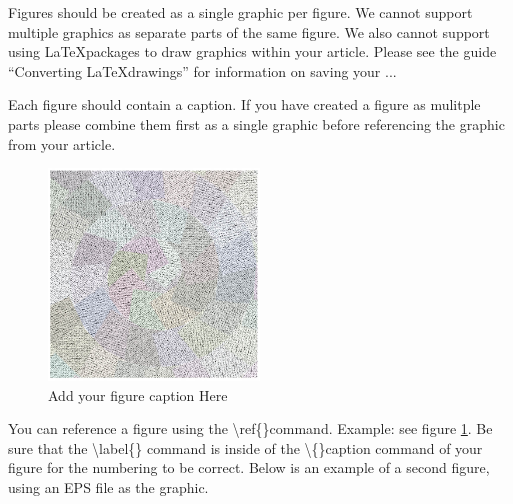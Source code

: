 \documentclass{csmagazine}
\begin{document}
\begin{flushleft}
Figures should be created as a single graphic per figure. We cannot support multiple graphics as separate parts of the same figure. We also cannot support using \LaTeX packages to draw graphics within your article. Please see the guide ``Converting \LaTeX drawings'' for information on saving your ...

Each figure should contain a caption. If you have created a figure as mulitple parts please combine them first as a single graphic before referencing the graphic from your article. 


\begin{figure}[H]
	\begin{center}	
		\includegraphics[width=0.5\textwidth]{figure_1.jpg}
		\caption{Add your figure caption Here \label{fig:example_fig}}		
	\end{center}
\end{figure}

You can reference a figure using the \textbackslash{}ref\{\}command. Example: see figure \ref{fig:example_fig}. Be sure that the \textbackslash{}label\{\} command is inside of the \textbackslash{}\{\}caption command of your figure for the numbering to be correct. Below is an example of a second figure, using an EPS file as the graphic.


\end{flushleft}
\end{document}
